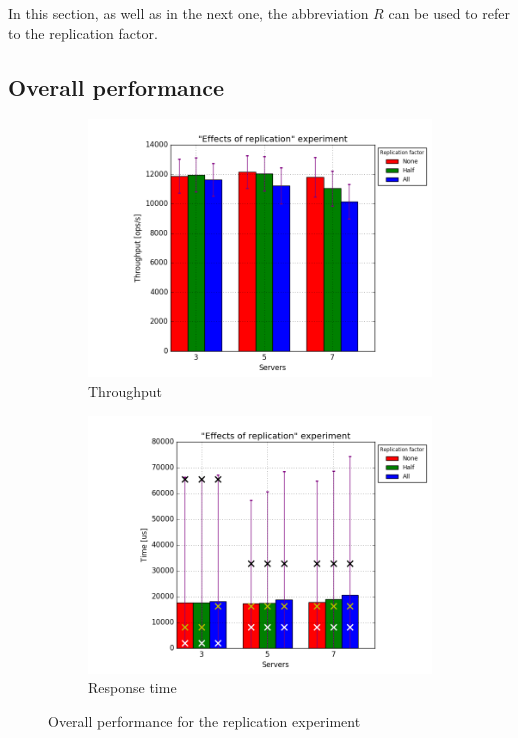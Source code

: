 \documentclass[11pt]{article}
\begin{document}
In this section, as well as in the next one, the abbreviation $R$ can be used to refer to the replication factor.

\subsection{Overall performance}
\label{sec:replication-overall}

\begin{figure}
\centering
\begin{subfigure}{.5\textwidth}
	\centering
	\includegraphics[width=\linewidth]{plots/replication}
	\caption{Throughput}
	\label{fig:replication-throughput}
\end{subfigure}%
\begin{subfigure}{.5\textwidth}
	\centering
	\includegraphics[width=\linewidth]{plots/replication-response_time}
	\caption{Response time}
	\label{fig:replication-reponse-time}
\end{subfigure}
\caption{Overall performance for the replication experiment}
\label{fig:replication-overall}
\end{figure}
\end{document}
